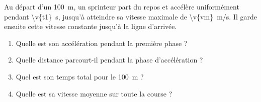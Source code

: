 Au départ d'un \qty{100}{m}, un sprinteur part du repos et accélère uniformément pendant \qty{\v{t1}}{s}, jusqu'à atteindre sa vitesse maximale de \qty{\v{vm}}{m/s}. Il garde ensuite cette vitesse constante jusqu'à la ligne d'arrivée.

\begin{enumerate}[label=\alph*)]
    \item Quelle est son accélération pendant la première phase ?
    \item Quelle distance parcourt-il pendant la phase d'accélération ?
    \item Quel est son temps total pour le \qty{100}{m} ?
    \item Quelle est sa vitesse moyenne sur toute la course ?
\end{enumerate}

